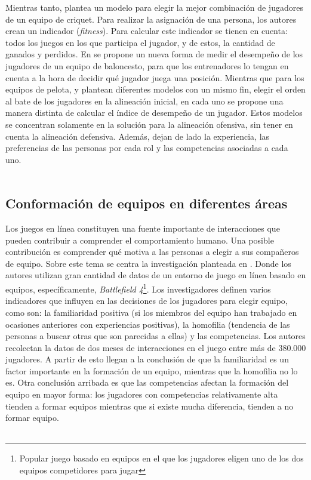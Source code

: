 Mientras tanto, \cite{Burney2012} plantea un modelo para elegir la mejor combinación de jugadores de un equipo de criquet. Para realizar la asignación de una persona, los autores crean un indicador (\textit{fitness}). Para calcular este indicador se tienen en cuenta: todos los juegos en los que participa el jugador, y de estos, la cantidad de ganados y perdidos. En \cite{Cooper2009} se propone un nueva forma de medir el desempeño de los jugadores de un equipo de baloncesto, para que los entrenadores lo tengan en cuenta a la hora de decidir qué jugador juega una posición. Mientras que para los equipos de pelota, \cite{Polyashuk2015} y \cite{Sugrue2007} plantean diferentes modelos con un mismo fin, elegir el orden al bate de los jugadores en la alineación inicial, en cada uno se propone una manera distinta de calcular el índice de desempeño de un jugador. Estos modelos se concentran solamente en la solución para la alineación ofensiva, sin tener en cuenta la alineación defensiva. Además, dejan de lado la experiencia, las preferencias de las personas por cada rol y las competencias asociadas a cada uno.\\\\


\subsection{Conformación de equipos en diferentes áreas}
Los juegos en línea constituyen una fuente importante de interacciones que pueden contribuir a comprender el comportamiento humano. Una posible contribución es comprender qué motiva a las personas a elegir a sus compañeros de equipo. Sobre este tema se centra la investigación planteada en \cite{Alhazmi2017}. Donde los autores utilizan gran cantidad de datos de un entorno de juego en línea basado en equipos, específicamente, \textit{Battlefield 4}\footnote{Popular juego basado en equipos en el que los jugadores eligen uno de los dos equipos competidores para jugar}. Los investigadores definen varios indicadores que influyen en las decisiones de los jugadores para elegir equipo, como son: la familiaridad positiva (si los miembros del equipo han trabajado en ocasiones anteriores con experiencias positivas), la homofilia (tendencia de las personas a buscar otras que son parecidas a ellas) y las competencias. Los autores recolectan la datos de dos meses de interacciones en el juego entre más de 380.000 jugadores. A partir de esto llegan a la conclusión de que la familiaridad es un factor importante en la formación de un equipo, mientras que la homofilia no lo es. Otra conclusión arribada es que las competencias afectan la formación del equipo en mayor forma: los jugadores con competencias relativamente alta tienden a formar equipos mientras que si existe mucha diferencia, tienden a no formar equipo.\\\\

